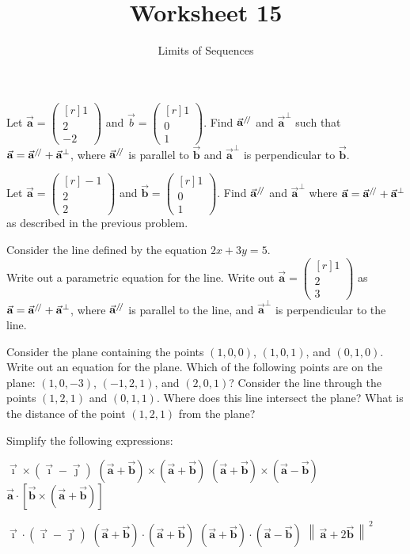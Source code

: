 \documentclass[paper=letter, 11pt]{article}
\title{Worksheet 15}
\subtitle{Limits of Sequences}
\newcommand*{\vek}{\begin{pmatrix*}[r]}
\newcommand*{\tor}{\end{pmatrix*}}
\renewcommand{\v}[1]{\vec{\mathbf{#1}}}
\renewcommand*{\ll}{/\kern-0.15em/}
\begin{document}
\maketitle

\Prob Let $\v{a} = \vek 1 \\ 2 \\ -2 \tor$ and $\vec{b} = \vek 1 \\ 0 \\ 1 \tor$.
Find $\v{a}^{\ll}$ and $\v{a}^{\perp}$ such that $\v{a} = \v{a}^{\ll} + \v{a}^{\perp}$,
where $\v{a}^{\ll}$ is parallel to $\v{b}$ and $\v{a}^{\perp}$ is perpendicular to $\v{b}$.

\vfil\vfil

\Prob Let $\v{a} = \vek -1 \\ 2 \\ 2 \tor$ and $\v{b} = \vek 1 \\ 0 \\ 1 \tor$.
Find $\v{a}^{\ll}$ and $\v{a}^{\perp}$ where $\v{a} = \v{a}^{\ll} + \v{a}^{\perp}$
as described in the previous problem.

\vfil\vfil

\Prob Consider the line defined by the equation $2x + 3y = 5$.\\

\subprob Write out a parametric equation for the line.\vfil
\subprob Write out $\v{a} = \vek 1 \\ 2 \\ 3 \tor$ as $\v{a} = \v{a}^{\ll} + \v{a}^{\perp}$,
where $\v{a}^{\ll}$ is parallel to the line, and $\v{a}^{\perp}$ is perpendicular to the line.
\vfil\vfil

\newpage

\Prob Consider the plane containing the points $(1,0,0)$, $(1,0,1)$, and $(0,1,0)$.\\

\subprob Write out an equation for the plane.\vfil
\subprob Which of the following points are on the plane: $(1, 0, -3)$, $(-1, 2, 1)$,
and $(2, 0, 1)$?\vfil
\subprob Consider the line through the points $(1,2,1)$ and $(0,1,1)$.  Where does
this line intersect the plane?\vfil
\subprob What is the distance of the point $(1,2,1)$ from the plane?\vfil

\newpage

\Prob Simplify the following expressions:


\begin{multicols}{2}
    \subprob $\v{\imath} \times (\v{\imath} - \v{\jmath})$  \vskip2cm
    \subprob $(\v{a} + \v{b}) \times (\v{a} + \v{b})$ \vskip2cm
    \subprob $(\v{a} + \v{b}) \times (\v{a} - \v{b})$ \vskip2cm
    \subprob $\v{a} \cdot \left[\v{b} \times \left(\v{a} + \v{b}\right) \right]$ \vskip2cm

    \columnbreak

    \subprob $\v{\imath} \cdot (\v{\imath} - \v{\jmath})$ \vskip2cm
    \subprob $(\v{a} + \v{b}) \cdot (\v{a} + \v{b})$ \vskip2cm
    \subprob $(\v{a} + \v{b}) \cdot (\v{a} - \v{b})$ \vskip2cm
    \subprob ${\left\|\,\v{a} + 2\v{b}\,\right\|}^{\,2}$
\end{multicols}
\vskip2.5cm
\end{document}
